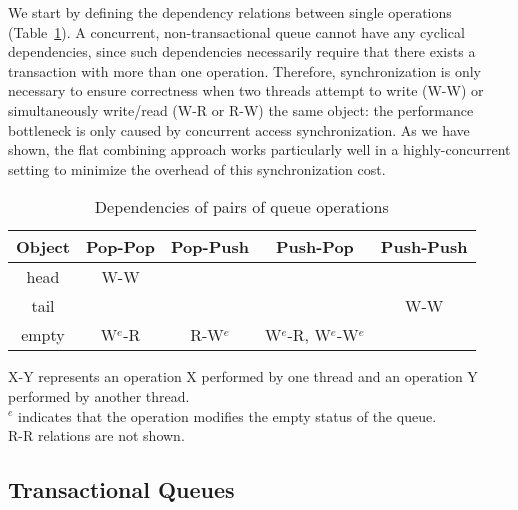 We start by defining the dependency relations between single operations (Table~\ref{table:queuesimpledeps}). A concurrent, non-transactional queue cannot have any cyclical dependencies, since such dependencies necessarily require that there exists a transaction with more than one operation. Therefore, synchronization is only necessary to ensure correctness when two threads attempt to write (W-W) or simultaneously write/read (W-R or R-W) the same object: the performance bottleneck is only caused by concurrent access synchronization. As we have shown, the flat combining approach works particularly well in a highly-concurrent setting to minimize the overhead of this synchronization cost.

\begin{table}[h!]
    \centering
\begin{tabular}{c||c|c|c|c}
    Object & Pop-Pop & Pop-Push & Push-Pop & Push-Push\\
    \hline
    head & W-W & & & \\
    tail & & & & W-W\\
    empty & W$^e$-R & R-W$^e$ & W$^e$-R, W$^e$-W$^e$ & \\
\end{tabular}
    \caption*{X-Y represents an operation X performed by one thread and an operation Y performed by another thread.\\$^e$ indicates that the operation modifies the empty status of the queue.\\R-R relations are not shown.}
    \caption{Dependencies of pairs of queue operations}
    \label{table:queuesimpledeps}
\end{table}

\subsection{Transactional Queues}

